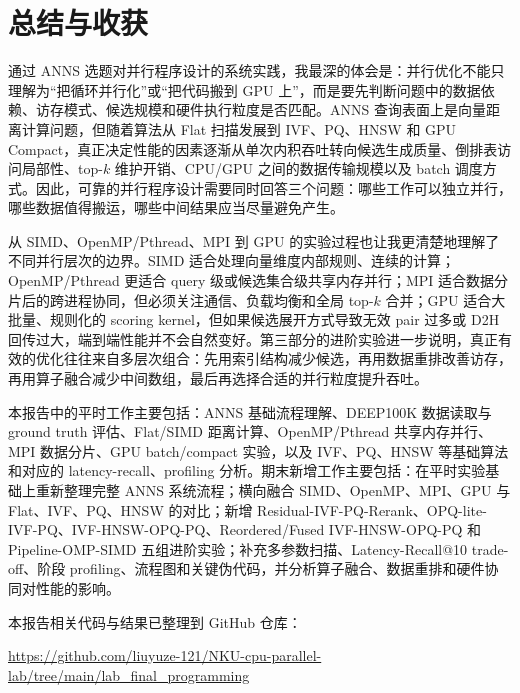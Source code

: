 \documentclass[a4paper]{article}
\begin{document}
\section{总结与收获}

通过 ANNS 选题对并行程序设计的系统实践，我最深的体会是：并行优化不能只理解为“把循环并行化”或“把代码搬到 GPU 上”，而是要先判断问题中的数据依赖、访存模式、候选规模和硬件执行粒度是否匹配。ANNS 查询表面上是向量距离计算问题，但随着算法从 Flat 扫描发展到 IVF、PQ、HNSW 和 GPU Compact，真正决定性能的因素逐渐从单次内积吞吐转向候选生成质量、倒排表访问局部性、top-$k$ 维护开销、CPU/GPU 之间的数据传输规模以及 batch 调度方式。因此，可靠的并行程序设计需要同时回答三个问题：哪些工作可以独立并行，哪些数据值得搬运，哪些中间结果应当尽量避免产生。

从 SIMD、OpenMP/Pthread、MPI 到 GPU 的实验过程也让我更清楚地理解了不同并行层次的边界。SIMD 适合处理向量维度内部规则、连续的计算；OpenMP/Pthread 更适合 query 级或候选集合级共享内存并行；MPI 适合数据分片后的跨进程协同，但必须关注通信、负载均衡和全局 top-$k$ 合并；GPU 适合大批量、规则化的 scoring kernel，但如果候选展开方式导致无效 pair 过多或 D2H 回传过大，端到端性能并不会自然变好。第三部分的进阶实验进一步说明，真正有效的优化往往来自多层次组合：先用索引结构减少候选，再用数据重排改善访存，再用算子融合减少中间数组，最后再选择合适的并行粒度提升吞吐。

本报告中的平时工作主要包括：ANNS 基础流程理解、DEEP100K 数据读取与 ground truth 评估、Flat/SIMD 距离计算、OpenMP/Pthread 共享内存并行、MPI 数据分片、GPU batch/compact 实验，以及 IVF、PQ、HNSW 等基础算法和对应的 latency-recall、profiling 分析。期末新增工作主要包括：在平时实验基础上重新整理完整 ANNS 系统流程；横向融合 SIMD、OpenMP、MPI、GPU 与 Flat、IVF、PQ、HNSW 的对比；新增 Residual-IVF-PQ-Rerank、OPQ-lite-IVF-PQ、IVF-HNSW-OPQ-PQ、Reordered/Fused IVF-HNSW-OPQ-PQ 和 Pipeline-OMP-SIMD 五组进阶实验；补充多参数扫描、Latency-Recall@10 trade-off、阶段 profiling、流程图和关键伪代码，并分析算子融合、数据重排和硬件协同对性能的影响。

本报告相关代码与结果已整理到 GitHub 仓库：
\begin{center}
\scriptsize\url{https://github.com/liuyuze-121/NKU-cpu-parallel-lab/tree/main/lab_final_programming}
\end{center}
\end{document}
